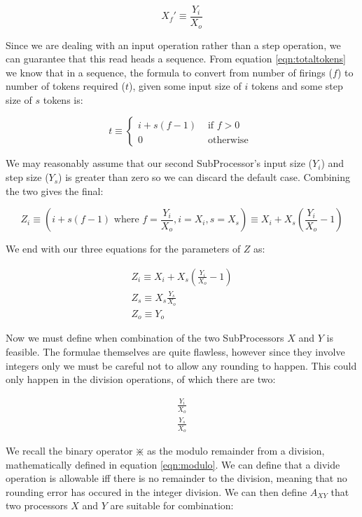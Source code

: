 \begin{equation}
X_f' \equiv \frac{Y_i}{X_o}
\end{equation}

Since we are dealing with an input operation rather than a step operation, we can guarantee that this read heads a sequence. From equation \ref{eqn:totaltokens} we know that in a sequence, the formula to convert from number of firings ($f$) to number of tokens required ($t$), given some input size of $i$ tokens and some step size of $s$ tokens is:

\begin{equation}
t \equiv \begin{cases}
i + s(f - 1) & \text{ if } f > 0 \\
0 & \text{ otherwise }
\end{cases}
\end{equation}

We may reasonably assume that our second SubProcessor's input size ($Y_i$) and step size ($Y_s$) is greater than zero so we can discard the default case. Combining the two gives the final:

\begin{equation}
Z_i \equiv (i + s(f - 1) \text{ where } f = \frac{Y_i}{X_o}, i = X_i, s = X_s) \equiv X_i + X_s(\frac{Y_i}{X_o} - 1)
\end{equation}

We end with our three equations for the parameters of $Z$ as:

\begin{eqnarray}
Z_i \equiv X_i + X_s(\frac{Y_i}{X_o} - 1) \\
Z_s \equiv X_s\frac{Y_s}{X_o} \\
Z_o \equiv Y_o
\end{eqnarray}

Now we must define when combination of the two SubProcessors $X$ and $Y$ is feasible. The formulae themselves are quite flawless, however since they involve integers only we must be careful not to allow any rounding to happen. This could only happen in the division operations, of which there are two:

\begin{eqnarray}
\frac{Y_i}{X_o}\\
\frac{Y_s}{X_o}
\end{eqnarray}

We recall the binary operator $\divideontimes$ as the modulo remainder from a division, mathematically defined in equation \ref{eqn:modulo}. We can define that a divide operation is allowable iff there is no remainder to the division, meaning that no rounding error has occured in the integer division. We can then define $A_{XY}$ that two processors $X$ and $Y$ are suitable for combination:

